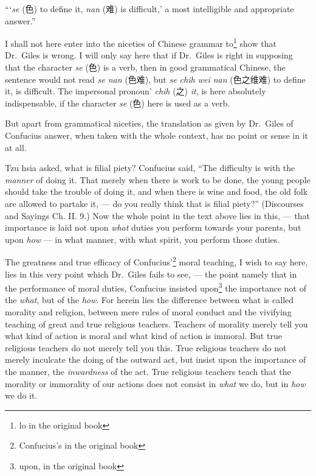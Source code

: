 ``\thinspace`\emph{se} (色) to define it, \emph{nan} (难) is difficult,' a most intelligible and appropriate answer.''

I shall not here enter into the niceties of Chinese grammar to\footnote{lo in the original book} show that Dr.~Giles is wrong.
I will only say here that if Dr.~Giles is right in supposing that the character \emph{se} (色) is a verb, then in good grammatical Chinese, the sentence would not read \emph{se nan} (色难), but \emph{se chih wei nan} (色之维难) to define it, is difficult.
The impersonal pronoun' \emph{chih} (之) \emph{it}, is here absolutely indispensable, if the character \emph{se} (色) here is used as a verb.

But apart from grammatical niceties, the translation as given by Dr.~Giles of Confucius answer, when taken with the whole context, has no point or sense in it at all.

Tzu hsia asked, what is filial piety?
Confucius said, ``The difficulty is with the \emph{manner}\cite{num25} of doing it. That merely when there is work to be done, the young people should take the trouble of doing it, and when there is wine and food, the old folk are allowed to partake it, --- do you really think that is filial piety?'' (Discourses and Sayings Ch. II. 9.)
Now the whole point in the text above lies in this, --- that importance is laid not upon \emph{what} duties you perform towards your parents, but upon \emph{how} --- in what manner, with what spirit, you perform those duties.

The greatness and true efficacy of Confucius'\footnote{Confucius's in the original book} moral teaching, I wish to say here, lies in this very point which Dr.~Giles fails to see, --- the point namely that in the performance of moral duties, Confucius insisted upon\footnote{upon, in the original book} the importance not of the \emph{what}, but of the \emph{how}.
For herein lies the difference between what is called morality and religion, between mere rules of moral conduct and the vivifying teaching of great and true religious teachers.
Teachers of morality merely tell you what kind of action is moral and what kind of action is immoral.
But true religious teachers do not merely tell you this.
True religious teachers do not merely inculcate the doing of the outward act, but insist upon the importance of the manner, the \emph{inwardness} of the act.
True religious teachers teach that the morality or immorality of our actions does not consist in \emph{what} we do, but in \emph{how} we do it.


